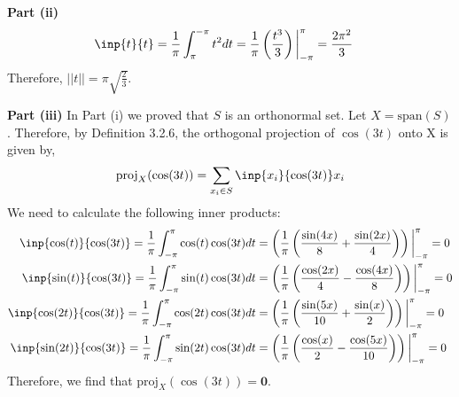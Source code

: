 \documentclass[letterpaper,12pt]{article}
\theoremstyle{definition}
\begin{document}
\noindent\textbf{Part (ii)}
\begin{align*}
	\inp{t}{t} &= \frac{1}{\pi} \int_{\pi}^{-\pi} t^2 dt = \frac{1}{\pi}\left( \frac{t^3}{3}\right)\bigg\rvert_{-\pi}^{\pi} = \frac{2\pi^2}{3}
\end{align*}
Therefore, $||t|| = \pi \sqrt{\frac{2}{3}}$.

\noindent\textbf{Part (iii)}
In Part (i) we proved that $S$ is an orthonormal set. Let $X = \text{span}(S)$. Therefore, by Definition 3.2.6, the orthogonal projection of $\cos(3t)$ onto X is given by,
\begin{equation}
	\text{proj}_X(\cos(3t)) = \sum_{x_i \in S} \inp{x_i}{\cos(3t)} x_i
\end{equation}
We need to calculate the following inner products:
\begin{align*}
	\inp{\cos(t)}{\cos(3t)} = \frac{1}{\pi} \int_{-\pi}^{\pi} \cos(t) \cos(3t) dt &= \left(\frac{1}{\pi}\left( \frac{\sin(4x)}{8}  + \frac{\sin(2x)}{4}\right) \right) \bigg\rvert_{-\pi}^{\pi} = 0  \\
	\inp{\sin(t)}{\cos(3t)} = \frac{1}{\pi} \int_{-\pi}^{\pi} \sin(t) \cos(3t) dt &= \left(\frac{1}{\pi}\left( \frac{\cos(2x)}{4} - \frac{\cos(4x)}{8}\right) \right) \bigg\rvert_{-\pi}^{\pi} = 0  \\
	\inp{\cos(2t)}{\cos(3t)} = \frac{1}{\pi} \int_{-\pi}^{\pi} \cos(2t) \cos(3t) dt &= \left(\frac{1}{\pi}\left( \frac{\sin(5x)}{10}  + \frac{\sin(x)}{2}\right) \right) \bigg\rvert_{-\pi}^{\pi} = 0  \\
	\inp{\sin(2t)}{\cos(3t)} = \frac{1}{\pi} \int_{-\pi}^{\pi} \sin(2t) \cos(3t) dt &= \left(\frac{1}{\pi}\left( \frac{\cos(x)}{2}  - \frac{\cos(5x)}{10}\right) \right) \bigg\rvert_{-\pi}^{\pi} = 0  \\
\end{align*}
Therefore, we find that $\text{proj}_X(\cos(3t)) = \mathbf{0}$.
\end{document}
